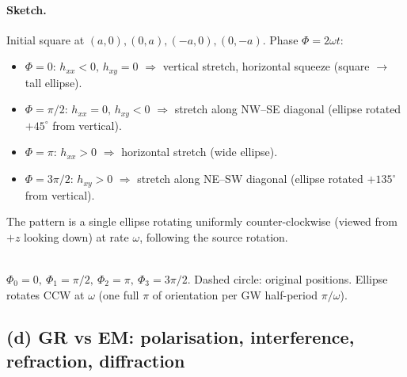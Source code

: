 \documentclass[11pt]{article}
\begin{document}
\paragraph{Sketch.}
Initial square at $(a,0),(0,a),(-a,0),(0,-a)$. Phase $\Phi=2\omega t$:
\begin{itemize}\itemsep0pt
\item $\Phi=0$: $h_{xx}<0,\,h_{xy}=0$ $\Rightarrow$ vertical stretch, horizontal squeeze (square $\to$ tall ellipse).
\item $\Phi=\pi/2$: $h_{xx}=0,\,h_{xy}<0$ $\Rightarrow$ stretch along NW--SE diagonal (ellipse rotated $+45^\circ$ from vertical).
\item $\Phi=\pi$: $h_{xx}>0$ $\Rightarrow$ horizontal stretch (wide ellipse).
\item $\Phi=3\pi/2$: $h_{xy}>0$ $\Rightarrow$ stretch along NE--SW diagonal (ellipse rotated $+135^\circ$ from vertical).
\end{itemize}
The pattern is a single ellipse rotating uniformly counter-clockwise (viewed from $+z$ looking down) at rate $\omega$, following the source rotation.
\begin{center}
\\
\footnotesize $\Phi_0=0,\ \Phi_1=\pi/2,\ \Phi_2=\pi,\ \Phi_3=3\pi/2$. Dashed circle: original positions. Ellipse rotates CCW at $\omega$ (one full $\pi$ of orientation per GW half-period $\pi/\omega$).
\end{center}

\subsection*{(d) GR vs EM: polarisation, interference, refraction, diffraction}
\end{document}
